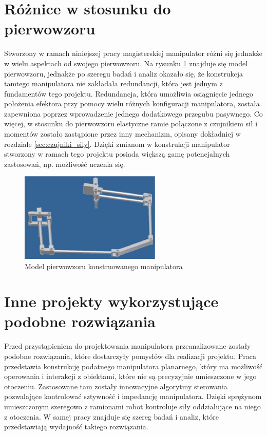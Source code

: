 \documentclass[printmode]{mgr}
\begin{document}
\section{Różnice w stosunku do pierwowzoru}\label{sec:roznice_do_pierwowzoru}
Stworzony w ramach niniejszej pracy magisterskiej manipulator różni się jednakże w wielu aspektach od
swojego pierwowzoru. Na rysunku \ref{rys:pierwowzor_model} znajduje się model pierwowzoru, jednakże po szeregu badań i analiz 
okazało się, że konstrukcja tamtego manipulatora nie zakładała redundancji, która jest jednym z
fundamentów tego projektu. Redundancja, która umożliwia osiągnięcie jednego położenia efektora przy pomocy
wielu różnych konfiguracji manipulatora, została zapewniona poprzez wprowadzenie jednego dodatkowego przegubu
pasywnego. Co więcej, w stosunku do pierwowzoru elastyczne ramie połączone z czujnikiem sił i momentów
zostało zastąpione przez inny mechanizm, opisany dokładniej w rozdziale \ref{sec:czujniki_sily}.
Dzięki zmianom w konstrukcji manipulator stworzony w ramach tego projektu posiada większą gamę
potencjalnych zastosowań, np. możliwość uczenia się. 

\begin{figure}[tp]
\centering
  \includegraphics[width=0.6\textwidth]{grafika/pierwowzor_model}
  \caption{Model pierwowzoru konstruowanego manipulatora}
  \label{rys:pierwowzor_model}  
\end{figure}


\section{Inne projekty wykorzystujące podobne rozwiązania}
Przed przystąpieniem do projektowania manipulatora przeanalizowane zostały podobne rozwiązania, które
dostarczyły pomysłów dla realizacji projektu. Praca \cite{inne1} przedstawia konstrukcję podatnego manipulatora planarnego,
który ma możliwość operowania i interakcji z obiektami, które nie są precyzyjnie umieszczone w jego otoczeniu.
Zastosowane tam zostały innowacyjne algorytmy sterowania pozwalające kontrolować sztywność i impedancję manipulatora.
Dzięki sprężynom umieszczonym szeregowo z ramionami robot kontroluje siły oddziałujące na niego z otoczenia. 
W samej pracy znajduje się szereg badań i analiz, które przedstawiają wydajność takiego rozwiązania.
\end{document}
